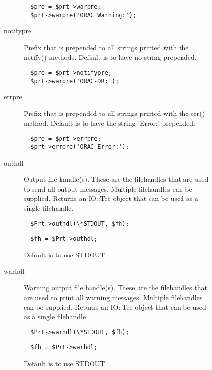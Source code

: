 \begin{description}
\begin{description}
\begin{description}
\begin{verbatim}
  $pre = $prt->warpre;
  $prt->warpre('ORAC Warning:');
\end{verbatim}

\item[{notifypre}] \mbox{}

Prefix that is prepended to all strings printed with the
notify() methods. Default is to have no string prepended.

\begin{verbatim}
  $pre = $prt->notifypre;
  $prt->warpre('ORAC-DR:');
\end{verbatim}

\item[{errpre}] \mbox{}

Prefix that is prepended to all strings printed with the
err() method. Default is to have the string 'Error:' prepended.

\begin{verbatim}
  $pre = $prt->errpre;
  $prt->errpre('ORAC Error:');
\end{verbatim}

\item[{outhdl}] \mbox{}

Output file handle(s). These are the filehandles that are used
to send all output messages. Multiple filehandles can be supplied.
Returns an IO::Tee object that can be used as a single filehandle.

\begin{verbatim}
  $Prt->outhdl(\*STDOUT, $fh);
\end{verbatim}
\begin{verbatim}
  $fh = $Prt->outhdl;
\end{verbatim}


Default is to use STDOUT.


\item[{warhdl}] \mbox{}

Warning output file handle(s). These are the filehandles that are used
to print all warning messages. Multiple filehandles can be supplied.
Returns an IO::Tee object that can be used as a single filehandle.

\begin{verbatim}
  $Prt->warhdl(\*STDOUT, $fh);
\end{verbatim}
\begin{verbatim}
  $fh = $Prt->warhdl;
\end{verbatim}


Default is to use STDOUT.



\end{description}
\end{description}
\end{description}
